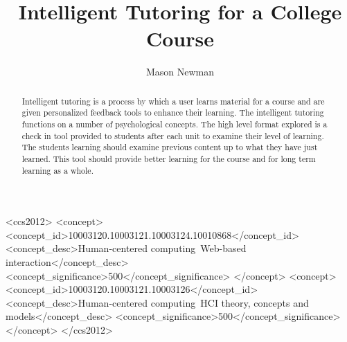 \documentclass[acmtog]{acmart}
\begin{document}
\title{Intelligent Tutoring for a College Course}

\author{Mason Newman}


\renewcommand{\shortauthors}{Newman}

\begin{abstract}
  Intelligent tutoring is a process by which a user learns material for a course and are given personalized feedback tools to enhance their learning. The intelligent tutoring functions on a number of psychological concepts. The high level format explored is a check in tool provided to students after each unit to examine their level of learning. The students learning should examine previous content up to what they have just learned. This tool should provide better learning for the course and for long term learning as a whole.
\end{abstract}

\begin{CCSXML}
<ccs2012>
   <concept>
       <concept_id>10003120.10003121.10003124.10010868</concept_id>
       <concept_desc>Human-centered computing~Web-based interaction</concept_desc>
       <concept_significance>500</concept_significance>
       </concept>
   <concept>
       <concept_id>10003120.10003121.10003126</concept_id>
       <concept_desc>Human-centered computing~HCI theory, concepts and models</concept_desc>
       <concept_significance>500</concept_significance>
       </concept>
 </ccs2012>
\end{CCSXML}
\end{document}
